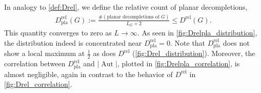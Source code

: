 \documentclass[12pt,a4paper]{article}
\newcommand{\abs}[1]{\lvert #1 \rvert}
\newcommand{\Aut}{\operatorname{Aut}}
\renewcommand{\|}{\rule[-0.4ex]{0.2ex}{1.2em}}
\begin{document}
In analogy to \cref{def:Drel}, we define the relative count of planar decompletions,
\begin{align}\label{def:Drel_planar}
	 D^\text{rel}_\text{pla} (G)   := \frac{\#( \text{planar decompletions of }G)}{L_G + 2}   \leq D^\text{rel}(G).
\end{align}
This quantity converges to zero as $L\rightarrow \infty$. As seen in \cref{fig:Drelpla_distribution}, the distribution indeed is concentrated near $ D^\text{rel}_\text{pla}=0$.  Note that $ D^\text{rel}_\text{pla}$ does not show a local maximum at $\frac 12$ as does $D^\text{rel}$ (\cref{fig:Drel_distribution}). Moreover, the correlation between $D^\text{rel}_\text{pla}$ and $\abs{\Aut}$, plotted in \cref{fig:Drelpla_correlation}, is almost negligible, again in contrast to the behavior of $D^\text{rel}$ in \cref{fig:Drel_correlation}.
\end{document}
